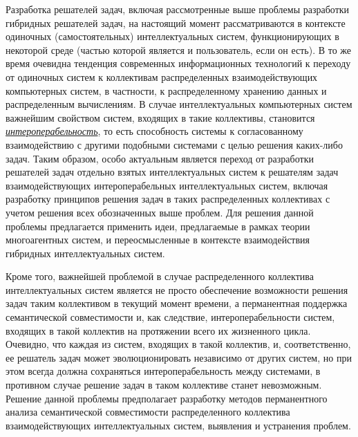Разработка решателей задач, включая рассмотренные выше проблемы разработки гибридных решателей задач, на настоящий момент рассматриваются в контексте одиночных (самостоятельных) интеллектуальных систем, функционирующих в некоторой среде (частью которой является и пользователь, если он есть). В то же время очевидна тенденция современных информационных технологий к переходу от одиночных систем к коллективам распределенных взаимодействующих компьютерных систем, в частности, к распределенному хранению данных и распределенным вычислениям. В случае интеллектуальных компьютерных систем важнейшим свойством систем, входящих в такие коллективы, становится \uline{\textit{интероперабельность}}, то есть способность системы к согласованному взаимодействию с другими подобными системами с целью решения каких-либо задач. Таким образом, особо актуальным является переход от разработки решателей задач отдельно взятых интеллектуальных систем к решателям задач взаимодействующих интероперабельных интеллектуальных систем, включая разработку принципов решения задач в таких распределенных коллективах с учетом решения всех обозначенных выше проблем. Для решения данной проблемы предлагается применить идеи, предлагаемые в рамках теории многоагентных систем, и переосмысленные в контексте взаимодействия гибридных интеллектуальных систем.

Кроме того, важнейшей проблемой в случае распределенного коллектива интеллектуальных систем является не просто обеспечение возможности решения задач таким коллективом в текущий момент времени, а перманентная поддержка семантической совместимости и, как следствие, интероперабельности систем, входящих в такой коллектив на протяжении всего их жизненного цикла. Очевидно, что каждая из систем, входящих в такой коллектив, и, соответственно, ее решатель задач может эволюционировать независимо от других систем, но при этом всегда должна сохраняться интероперабельность между системами, в противном случае решение задач в таком коллективе станет невозможным. Решение данной проблемы предполагает разработку методов перманентного анализа семантической совместимости распределенного коллектива взаимодействующих интеллектуальных систем, выявления и устранения проблем.

